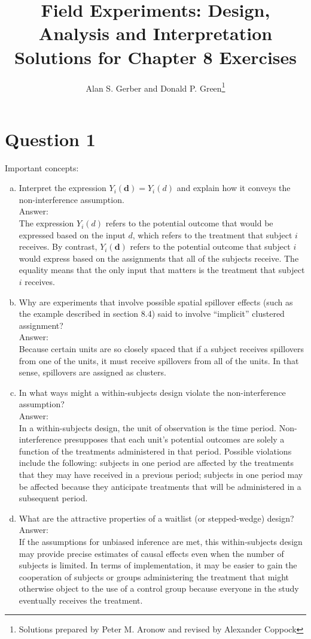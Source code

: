\documentclass[11pt,notitlepage]{article}\usepackage[]{graphicx}\usepackage[]{color}
\title{Field Experiments: Design, Analysis and Interpretation \\
Solutions for Chapter 8 Exercises}
\author{Alan S. Gerber and Donald P. Green\footnote{Solutions prepared by Peter M. Aronow and revised by Alexander Coppock}}
\date{\vspace{-5ex}}
\begin{document}
\maketitle

\section*{Question 1}
Important concepts:
\begin{enumerate}[a)]
\item Interpret the expression $Y_i(\mathbf{d}) = Y_i(d)$ and explain how it conveys the non-interference assumption.\\
Answer:\\
The expression $Y_i(d)$ refers to the potential outcome that would be expressed based on the input $d$, which refers to the treatment that subject $i$ receives.  By contrast, $Y_i(\mathbf{d})$ refers to the potential outcome that subject $i$ would express based on the assignments that all of the subjects receive. The equality means that the only input that matters is the treatment that subject $i$ receives. 

\item Why are experiments that involve possible spatial spillover effects (such as the example described in section 8.4) said to involve ``implicit'' clustered assignment?\\
Answer:\\
Because certain units are so closely spaced that if a subject receives spillovers from one of the units, it must receive spillovers from all of the units. In that sense, spillovers are assigned as clusters.

\item In what ways might a within-subjects design violate the non-interference assumption?\\
Answer:\\
In a within-subjects design, the unit of observation is the time period. Non-interference presupposes that each unit's potential outcomes are solely a function of the treatments administered in that period. Possible violations include the following: subjects in one period are affected by the treatments that they may have received in a previous period; subjects in one period may be affected because they anticipate treatments that will be administered in a subsequent period.  

\item What are the attractive properties of a waitlist (or stepped-wedge) design?\\
Answer:\\
If the assumptions for unbiased inference are met, this within-subjects design may provide precise estimates of causal effects even when the number of subjects is limited. In terms of implementation, it may be easier to gain the cooperation of subjects or groups administering the treatment that might otherwise object to the use of a control group because everyone in the study eventually receives the treatment.
\end{enumerate}
\end{document}
